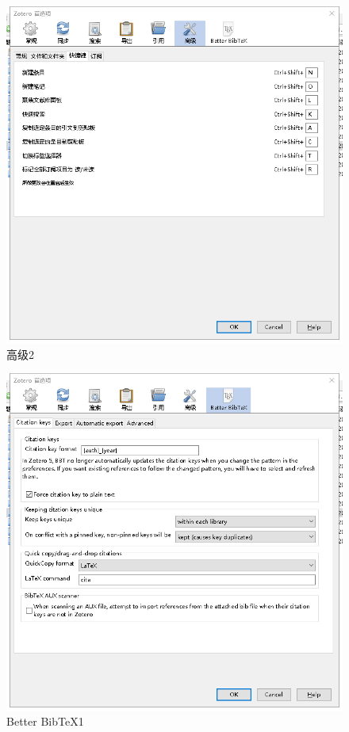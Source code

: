 \begin{figure}
	\centering
	\includegraphics[scale=0.8]{Fig/zotero8.png}
	\caption{\label{op8}高级2}
\end{figure}
\begin{figure}
	\centering
	\includegraphics[scale=0.8]{Fig/zotero9.png}
	\caption{\label{op9}Better BibTeX1}
\end{figure}
